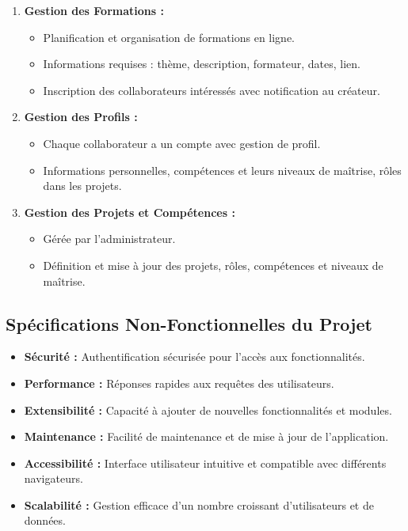 \documentclass{article}
\begin{document}
\begin{enumerate}
                \item \textbf{Gestion des Formations :}
                \begin{itemize}
                    \item Planification et organisation de formations en ligne.
                    \item Informations requises : thème, description, formateur, dates, lien.
                    \item Inscription des collaborateurs intéressés avec notification au créateur.
                \end{itemize}
                
                \item \textbf{Gestion des Profils :}
                \begin{itemize}
                    \item Chaque collaborateur a un compte avec gestion de profil.
                    \item Informations personnelles, compétences et leurs niveaux de maîtrise, rôles dans les projets.
                \end{itemize}
                
                \item \textbf{Gestion des Projets et Compétences :}
                \begin{itemize}
                    \item Gérée par l'administrateur.
                    \item Définition et mise à jour des projets, rôles, compétences et niveaux de maîtrise.
                \end{itemize}
            \end{enumerate}
        \subsection{Spécifications Non-Fonctionnelles du Projet}
            \begin{itemize}
                \item \textbf{Sécurité :} Authentification sécurisée pour l'accès aux fonctionnalités.
                \item \textbf{Performance :} Réponses rapides aux requêtes des utilisateurs.
                \item \textbf{Extensibilité :} Capacité à ajouter de nouvelles fonctionnalités et modules.
                \item \textbf{Maintenance :} Facilité de maintenance et de mise à jour de l'application.
                \item \textbf{Accessibilité :} Interface utilisateur intuitive et compatible avec différents navigateurs.
                \item \textbf{Scalabilité :} Gestion efficace d'un nombre croissant d'utilisateurs et de données.
            \end{itemize}
\end{document}
